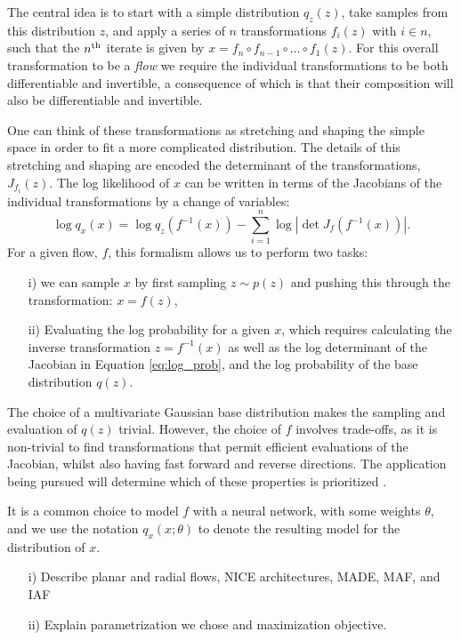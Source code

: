 \documentclass[fleqn,usenatbib]{mnras}
\begin{document}
The central idea is to start with a simple distribution $q_z(z)$, take samples from this distribution $z$, and apply a series of $n$ transformations $f_i(z)$ with $i\in n$, such that the $n^{\rm th}$ iterate is given by $x = f_n \circ f_{n-1} \circ \dots \circ f_1(z)$. For this overall transformation to be a \emph{flow} we require the individual transformations to be both differentiable and invertible, a consequence of which is that their composition will also be differentiable and invertible.

One can think of these transformations as stretching and shaping the simple space in order to fit a more complicated distribution. The details of this stretching and shaping are encoded the determinant of the transformations, $J_{f_i}(z)$. The log likelihood of $x$ can be written in terms of the Jacobians of the individual transformations by a change of variables:
\begin{equation}
\label{eq:log_prob}
    \log q_x(x) = \log q_z(f^{-1}(x)) - \sum_{i=1}^n \log | \det J_f(f^{-1}(x)) |.
\end{equation}
For a given flow, $f$, this formalism allows us to perform two tasks:
\begin{itemize}
\item[i)] we can sample $x$ by first sampling $z \sim p(z)$ and pushing this through the transformation: $x = f(z)$, 
\item[ii)] Evaluating the log probability for a given $x$, which requires calculating the inverse transformation $z = f^{-1}(x)$ as well as the log determinant of the Jacobian in Equation \ref{eq:log_prob}, and the log probability of the base distribution $q(z)$.  
\end{itemize}

The choice of a multivariate Gaussian base distribution makes the sampling and evaluation of $q(z)$ trivial. However, the choice of $f$ involves trade-offs, as it is non-trivial to find transformations that permit efficient evaluations of the Jacobian, whilst also having fast forward and reverse directions. The application being pursued will determine which of these properties is prioritized \cite{papamakarios/etal:2019}.

It is a common choice to model $f$ with a neural network, with some weights $\theta$, and we use the notation $q_x(x; \theta)$ to denote the resulting model for the distribution of $x$.

\begin{itemize}
\item[i)] Describe planar and radial flows, NICE architectures, MADE, MAF, and IAF
\item[ii)] Explain parametrization we chose and maximization objective.
\end{itemize}
\end{document}
